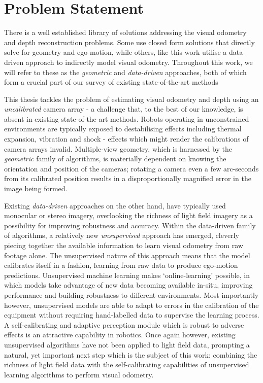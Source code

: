 \section{Problem Statement}

There is a well established library of solutions addressing the visual odometry and depth reconstruction problems. Some use closed form solutions that directly solve for geometry and ego-motion, while others, like this work utilise a data-driven approach to indirectly model visual odometry. Throughout this work, we will refer to these as the \textit{geometric} and \textit{data-driven} approaches, both of which form a crucial part of our survey of existing state-of-the-art methods

This thesis tackles the problem of estimating visual odometry and depth using an \textit{uncalibrated} camera array - a challenge that, to the best of our knowledge, is absent in existing state-of-the-art methods. Robots operating in unconstrained environments are typically exposed to destabilising effects including thermal expansion, vibration and shock - effects which might render the calibrations of camera arrays invalid. Multiple-view geometry, which is harnessed by the \textit{geometric} family of algorithms, is materially dependent on knowing the orientation and position of the cameras; rotating a camera even a few arc-seconds from its calibrated position results in a disproportionally magnified error in the image being formed. 

Existing \textit{data-driven} approaches on the other hand, have typically used monocular or stereo imagery, overlooking the richness of light field imagery as a possibility for improving robustness and accuracy. Within the data-driven family of algorithms, a relatively new \textit{unsupervised} approach has emerged, cleverly piecing together the available information to learn visual odometry from raw footage alone. The unsupervised nature of this approach means that the model calibrates itself in a fashion, learning from raw data to produce ego-motion predictions. Unsupervised machine learning makes `online-learning' possible, in which models take advantage of new data becoming available in-situ, improving performance and building robustness to different environments. Most importantly however, unsupervised models are able to adapt to errors in the calibration of the equipment without requiring hand-labelled data to supervise the learning process. A self-calibrating and adaptive perception module which is robust to adverse effects is an attractive capability in robotics. Once again however, existing unsupervised algorithms have not been applied to light field data, prompting a natural, yet important next step which is the subject of this work: combining the richness of light field data with the self-calibrating capabilities of unsupervised learning algorithms to perform visual odometry.



